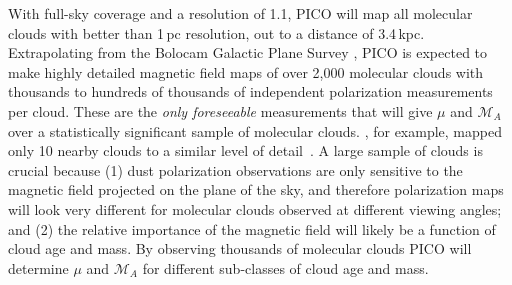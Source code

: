 \documentclass[PICOReport.tex]{subfiles}
\begin{document}
With full-sky coverage and a resolution of 1.1\arcmin, PICO will map all molecular clouds with better than 1\,pc resolution, out to a distance of 3.4\,kpc.  Extrapolating from the Bolocam Galactic Plane Survey \citep[BGPS,][]{EllsworthBowers2015}, PICO is expected to make highly detailed magnetic field maps of over 2,000 molecular clouds with thousands to hundreds of thousands of independent polarization measurements per cloud. These are the {\it only foreseeable} measurements that will give $\mu$ and $\mathcal{M}_A$ over a statistically significant sample of molecular clouds. \planck , for example, mapped only 10 nearby clouds to a similar level of detail~\citep{Planck:XXXV}. A large sample of clouds is crucial because (1) dust polarization observations are only sensitive to the magnetic field projected on the plane of the sky, and therefore polarization maps will look very different for molecular clouds observed at different viewing angles; and (2) the relative importance of the magnetic field will likely be a function of cloud age and mass. By observing thousands of molecular clouds PICO will determine $\mu$ and  $\mathcal{M}_A$ for different sub-classes of cloud age and mass. 

\end{document}
